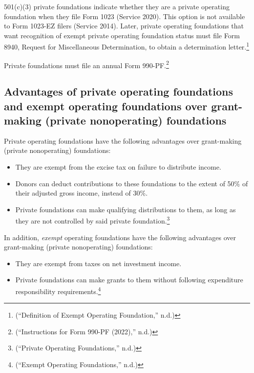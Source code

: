 \documentclass[
  letterpaper,
  DIV=11,
  numbers=noendperiod]{scrreprt}
\providecommand{\tightlist}{%
  \setlength{\itemsep}{0pt}\setlength{\parskip}{0pt}}\usepackage{longtable,booktabs,array}
\begin{document}
501(c)(3) private foundations indicate whether they are a private
operating foundation when they file Form 1023 (Service 2020). This
option is not available to Form 1023-EZ filers (Service 2014). Later,
private operating foundations that want recognition of exempt private
operating foundation status must file Form 8940, Request for
Miscellaneous Determination, to obtain a determination
letter.\footnote{({``Definition of Exempt Operating Foundation,''} n.d.)}

Private foundations must file an annual Form 990-PF.\footnote{({``Instructions
  for Form 990-PF (2022),''} n.d.)}

\hypertarget{advantages-of-private-operating-foundations-and-exempt-operating-foundations-over-grant-making-private-nonoperating-foundations}{%
\subsection{Advantages of private operating foundations and exempt
operating foundations over grant-making (private nonoperating)
foundations}\label{advantages-of-private-operating-foundations-and-exempt-operating-foundations-over-grant-making-private-nonoperating-foundations}}

Private operating foundations have the following advantages over
grant-making (private nonoperating) foundations:

\begin{itemize}
\tightlist
\item
  They are exempt from the excise tax on failure to distribute income.
\item
  Donors can deduct contributions to these foundations to the extent of
  50\% of their adjusted gross income, instead of 30\%.
\item
  Private foundations can make qualifying distributions to them, as long
  as they are not controlled by said private foundation.\footnote{({``Private
    Operating Foundations,''} n.d.)}
\end{itemize}

In addition, \emph{exempt} operating foundations have the following
advantages over grant-making (private nonoperating) foundations:

\begin{itemize}
\tightlist
\item
  They are exempt from taxes on net investment income.
\item
  Private foundations can make grants to them without following
  expenditure responsibility requirements.\footnote{({``Exempt Operating
    Foundations,''} n.d.)}
\end{itemize}
\end{document}
